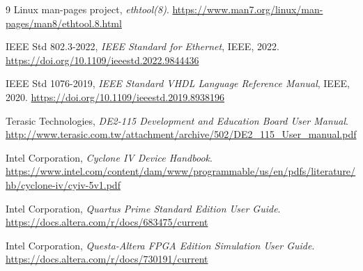 \documentclass[11pt,a4paper]{article}
\begin{document}
\begin{thebibliography}{9}
    Linux man-pages project, \emph{ethtool(8)}. \url{https://www.man7.org/linux/man-pages/man8/ethtool.8.html}

    IEEE Std 802.3-2022, \emph{IEEE Standard for Ethernet}, IEEE, 2022. \url{https://doi.org/10.1109/ieeestd.2022.9844436}

    IEEE Std 1076-2019, \emph{IEEE Standard VHDL Language Reference Manual}, IEEE, 2020. \url{https://doi.org/10.1109/ieeestd.2019.8938196}

    Terasic Technologies, \emph{DE2-115 Development and Education Board User Manual}. \url{http://www.terasic.com.tw/attachment/archive/502/DE2_115_User_manual.pdf}

    Intel Corporation, \emph{Cyclone IV Device Handbook}. \url{https://www.intel.com/content/dam/www/programmable/us/en/pdfs/literature/hb/cyclone-iv/cyiv-5v1.pdf}

    Intel Corporation, \emph{Quartus Prime Standard Edition User Guide}. \url{https://docs.altera.com/r/docs/683475/current}

    Intel Corporation, \emph{Questa-Altera FPGA Edition Simulation User Guide}. \url{https://docs.altera.com/r/docs/730191/current}
\end{thebibliography}
\end{document}
